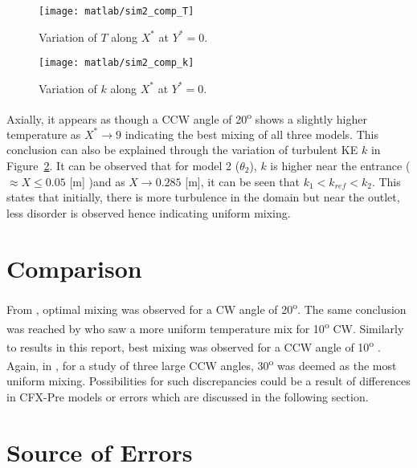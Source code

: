 \begin{figure}[H]
	\centering
	\texttt{[image: matlab/sim2\_comp\_T]}
	\caption{Variation of $T$ along $X^*$ at $Y^*=0$.}
	\label{fig:sim2_comp_T}
\end{figure}

\begin{figure}[H]
	\centering
	\texttt{[image: matlab/sim2\_comp\_k]}
	\caption{Variation of $k$ along $X^*$ at $Y^*=0$.}
	\label{fig:sim2_comp_k}
\end{figure}

Axially, it appears as though a CCW angle of 20\textsuperscript{o} shows a slightly higher temperature as $X^* \rightarrow 9$ indicating the best mixing of all three models. This conclusion can also be explained through the variation of turbulent KE $k$ in Figure~\ref{fig:sim2_comp_k}. It can be observed that for model 2 ($\theta_2$), $k$ is higher near the entrance ($\approx X\leq 0.05$ [m] )and as $X\rightarrow 0.285$ [m], it can be seen that $k_1 < k_{ref} < k_2$. This states that initially, there is more turbulence in the domain but near the outlet, less disorder is observed hence indicating uniform mixing.
\section{Comparison}
\label{sec:comp}

From \cite{mobin}, optimal mixing was observed for a CW angle of 20\textsuperscript{o}. The same conclusion was reached by \cite{curtis} who saw a more uniform temperature mix for 10\textsuperscript{o} CW. Similarly to results in this report, best mixing was observed for a CCW angle of 10\textsuperscript{o} \cite{tolu}. Again, in \cite{study}, for a study of three large CCW angles,  30\textsuperscript{o} was deemed as the most uniform mixing. Possibilities for such discrepancies could be a result of differences in CFX-Pre models or errors which are discussed in the following section.
 
\section{Source of Errors}
\label{sec:err}

